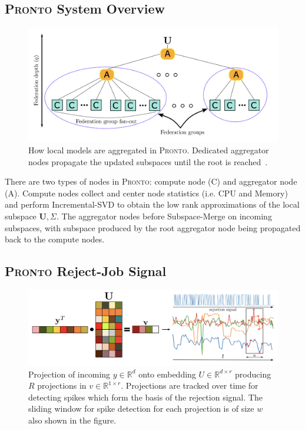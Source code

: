 \subsection{\protect\textsc{Pronto} System Overview}
\begin{figure}[ht]
    \centering
    \includegraphics[width=\textwidth]{images/pronto-agg.png}
    \caption{How local models are aggregated in \textsc{Pronto}. Dedicated aggregator
    nodes propagate the updated subspaces until the root is reached~\cite{grammenos_pronto_2021}.}
    \label{pronto-agg}
\end{figure}
There are two types of nodes in \textsc{Pronto}: compute node (C) and aggregator node
(A). Compute nodes collect and center node statistics (i.e. CPU and Memory) and
perform Incremental-SVD to obtain the low rank approximations of the local
subspace $\mathbf{U},\Sigma$. The aggregator nodes before Subspace-Merge on
incoming subspaces, with subspace produced by the root aggregator node being
propagated back to the compute nodes.

\subsection{\protect\textsc{Pronto} Reject-Job Signal}
\begin{figure}[ht]
    \centering
    \includegraphics[width=\textwidth]{images/pronto}
    \caption{Projection of incoming $y \in \mathbb{R}^d$ onto embedding $U \in
    \mathbb{R}^{d \times r}$ producing $R$ projections in $v \in \mathbb{R}^{1
    \times r}$. Projections are tracked over time for detecting spikes which
    form the basis of the rejection signal. The sliding window for spike
    detection for each projection is of size $w$ also shown in the figure.}
    \label{pronto-components}
\end{figure}

